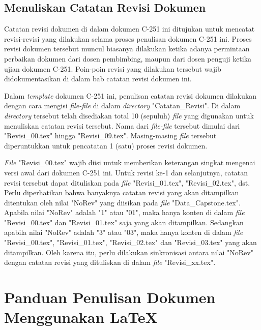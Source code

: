     \subsection{Menuliskan Catatan Revisi Dokumen}
    \label{subsec:Menuliskan_Catatan_Revisi_Dokumen}
    
    Catatan revisi dokumen di dalam dokumen C-251 ini ditujukan untuk mencatat revisi-revisi yang dilakukan selama proses penulisan dokumen C-251 ini. Proses revisi dokumen tersebut muncul biasanya dilakukan ketika adanya permintaan perbaikan dokumen dari dosen pembimbing, maupun dari dosen penguji ketika ujian dokumen C-251. Poin-poin revisi yang dilakukan tersebut wajib didokumentasikan di dalam bab catatan revisi dokumen ini.
    
    Dalam \textit{template} dokumen C-251 ini, penulisan catatan revisi dokumen dilakukan dengan cara mengisi \textit{file-file} di dalam \textit{directory} "Catatan\_Revisi". Di dalam \textit{directory} tersebut telah disediakan total 10 (sepuluh) \textit{file} yang digunakan untuk menuliskan catatan revisi tersebut. Nama dari \textit{file-file} tersebut dimulai dari "Revisi\_00.tex" hingga "Revisi\_09.tex". Masing-masing \textit{file} tersebut diperuntukkan untuk pencatatan 1 (satu) proses revisi dokumen. 

    
    
    \textit{File} "Revisi\_00.tex" wajib diisi untuk memberikan keterangan singkat mengenai versi awal dari dokumen C-251 ini. Untuk revisi ke-1 dan selanjutnya, catatan revisi tersebut dapat dituliskan pada \textit{file} "Revisi\_01.tex", "Revisi\_02.tex", dst. Perlu diperhatikan bahwa banyaknya catatan revisi yang akan ditampilkan ditentukan oleh nilai "NoRev" yang diisikan pada \textit{file} "Data\_Capstone.tex". Apabila nilai "NoRev" adalah "1" atau "01", maka hanya konten di dalam \textit{file} "Revisi\_00.tex" dan "Revisi\_01.tex" saja yang akan ditampilkan. Sedangkan apabila nilai "NoRev" adalah "3" atau "03", maka hanya konten di dalam \textit{file} "Revisi\_00.tex", "Revisi\_01.tex", "Revisi\_02.tex" dan "Revisi\_03.tex" yang akan ditampilkan. Oleh karena itu, perlu dilakukan sinkronisasi antara nilai "NoRev" dengan catatan revisi yang dituliskan di dalam \textit{file} "Revisi\_xx.tex".
    
\section{Panduan Penulisan Dokumen Menggunakan \LaTeX}
\label{sec:Contoh_Penulisan_Dokumen_Menggunakan_LaTeX}

